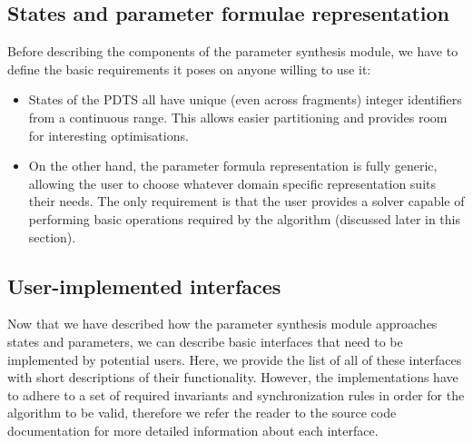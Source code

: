 \subsection{States and parameter formulae representation}

Before describing the components of the parameter synthesis module, we have to define the basic requirements it poses on anyone willing to use it:

\begin{itemize}
	\item States of the \ac{PDTS} all have unique (even across fragments) integer identifiers from a continuous range. This allows easier partitioning and provides room for interesting optimisations.
	\item On the other hand, the parameter formula representation is fully generic, allowing the user to choose whatever domain specific representation suits their needs. The only requirement is that the user provides a solver capable of performing basic operations required by the algorithm (discussed later in this section).
\end{itemize}

\subsection{User-implemented interfaces}

Now that we have described how the parameter synthesis module approaches states and parameters, we can describe basic interfaces that need to be implemented by potential users. Here, we provide the list of all of these interfaces with short descriptions of their functionality. However, the implementations have to adhere to a set of required invariants and synchronization rules in order for the algorithm to be valid, therefore we refer the reader to the source code documentation for more detailed information about each interface.

